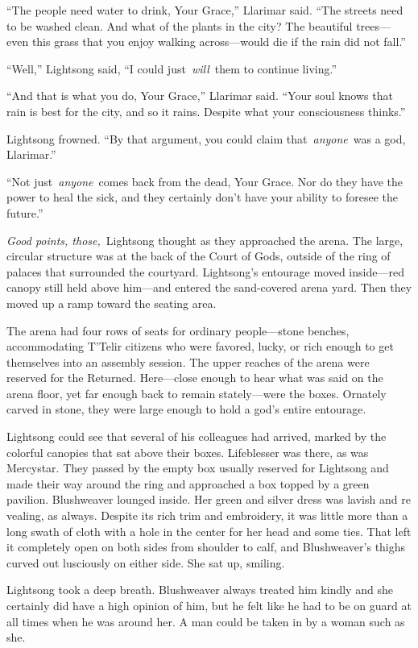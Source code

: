 “The people need water to drink, Your Grace,” Llarimar said. “The streets need to be washed clean. And what of the plants in the city? The beautiful trees—even this grass that you enjoy walking across—would die if the rain did not fall.”

“Well,” Lightsong said, “I could just~\textit{will}~them to continue living.”

“And that is what you do, Your Grace,” Llarimar said. “Your soul knows that rain is best for the city, and so it rains. Despite what your consciousness thinks.”

Lightsong frowned. “By that argument, you could claim that~\textit{anyone}~was a god, Llarimar.”

“Not just~\textit{anyone}~comes back from the dead, Your Grace. Nor do they have the power to heal the sick, and they certainly don’t have your ability to foresee the future.”

\textit{Good points, those,}~Lightsong thought as they approached the arena. The large, circular structure was at the back of the Court of Gods, outside of the ring of palaces that surrounded the courtyard. Lightsong’s entourage moved inside—red canopy still held above him—and entered the sand-covered arena yard. Then they moved up a ramp toward the seating area.

The arena had four rows of seats for ordinary people—stone benches, accommodating T’Telir citizens who were favored, lucky, or rich enough to get themselves into an assembly session. The upper reaches of the arena were reserved for the Returned. Here—close enough to hear what was said on the arena floor, yet far enough back to remain stately—were the boxes. Ornately carved in stone, they were large enough to hold a god’s entire entourage.

Lightsong could see that several of his colleagues had arrived, marked by the colorful canopies that sat above their boxes. Lifeblesser was there, as was Mercystar. They passed by the empty box usually reserved for Lightsong and made their way around the ring and approached a box topped by a green pavilion. Blushweaver lounged inside. Her green and silver dress was lavish and re vealing, as always. Despite its rich trim and embroidery, it was little more than a long swath of cloth with a hole in the center for her head and some ties. That left it completely open on both sides from shoulder to calf, and Blushweaver’s thighs curved out lusciously on either side. She sat up, smiling.

Lightsong took a deep breath. Blushweaver always treated him kindly and she certainly did have a high opinion of him, but he felt like he had to be on guard at all times when he was around her. A man could be taken in by a woman such as she.

